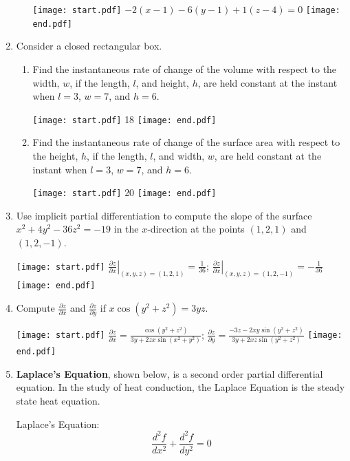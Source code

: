 \documentclass[12pt]{article}
\begin{document}
\begin{enumerate}
\begin{enumerate}
\texttt{[image: start.pdf]}
{{$-2(x-1)-6(y-1)+1(z-4)=0$}}
\texttt{[image: end.pdf]}


\end{enumerate}

\newpage

\item Consider a closed rectangular box.

\begin{enumerate}

\item Find the instantaneous rate of change of the volume with respect to the width, $w$, if the length, $l$, and  height, $h$, are held constant at the instant when $l=3$, $w=7$, and $h=6$.

\texttt{[image: start.pdf]}
{{18}}
\texttt{[image: end.pdf]}


\item Find the instantaneous rate of change of the surface area with respect to the height, $h$, if the length, $l$, and  width, $w$, are held constant at the instant when $l=3$, $w=7$, and $h=6$.

\texttt{[image: start.pdf]}
{{20}}
\texttt{[image: end.pdf]}


\end{enumerate}

\item Use implicit partial differentiation to compute the slope of the surface $x^2+4y^2-36z^2=-19$ in the $x$-direction at the points $(1,2,1)$ and $(1,2,-1)$.

\texttt{[image: start.pdf]}
{{$\left.\frac{\partial z}{\partial x}\right|_{(x,y,z)=(1,2,1)}=\frac{1}{36}$; $\left.\frac{\partial z}{\partial x}\right|_{(x,y,z)=(1,2,-1)}=-\frac{1}{36}$}}
\texttt{[image: end.pdf]}


\item Compute $\frac{\partial z}{\partial x}$ and $\frac{\partial z}{\partial y}$ if $x\cos{(y^2+z^2)}=3yz$.

\texttt{[image: start.pdf]}
{{$\frac{\partial z}{\partial x}=\frac{\cos{(y^2+z^2)}}{3y+2zx\sin{(x^2+y^2)}}$; $\frac{\partial z}{\partial y}=\frac{-3z-2xy\sin{(y^2+z^2)}}{3y+2xz\sin{(y^2+z^2)}}$}}
\texttt{[image: end.pdf]}


\item {\bf Laplace's Equation}, shown below, is a second order partial differential equation.  In the study of heat conduction, the Laplace Equation is the steady state heat equation.
\begin{center}
Laplace's Equation:
$$\frac{d^2f}{dx^2}+\frac{d^2f}{dy^2}=0$$
\end{center}


\end{enumerate}
\end{document}
